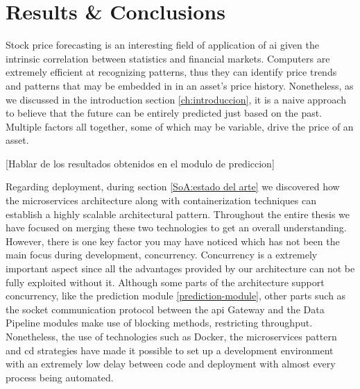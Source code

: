 \chapter{Results \& Conclusions}
\label{res:resultados}

Stock price forecasting is an interesting field of application of \gls{ai} given the intrinsic correlation between statistics and financial markets. Computers are extremely efficient at recognizing patterns, thus they can identify price trends and patterns that may be embedded in in an asset's price history. Nonetheless, as we discussed in the introduction section \ref{ch:introduccion}, it is a naive approach to believe that the future can be entirely predicted just based on the past. Multiple factors all together, some of which may be variable, drive the price of an asset.


[Hablar de los resultados obtenidos en el modulo de prediccion]

Regarding deployment, during section \ref{SoA:estado del arte} we discovered how the microservices architecture along with containerization techniques can establish a highly scalable architectural pattern. Throughout the entire thesis we have focused on merging these two technologies to get an overall understanding. However, there is one key factor you may have noticed which has not been the main focus during development, concurrency. Concurrency is a extremely important aspect since all the advantages provided by our architecture can not be fully exploited without it. Although some parts of the architecture support concurrency, like the prediction module \ref{prediction-module}, other parts such as the socket communication protocol between the \gls{api} Gateway and the Data Pipeline modules make use of blocking methods, restricting throughput. Nonetheless, the use of technologies such as Docker, the microservices pattern and \gls{cd} strategies have made it possible to set up a development environment with an extremely low delay between code and deployment with almost every process being automated.
